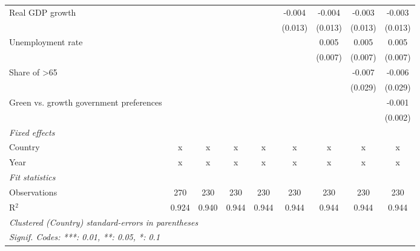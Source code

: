 \begin{table}[htbp]
\begin{tabular}{lcccccccc}
      Real GDP growth                                                 &         &         &                &                & -0.004         & -0.004         & -0.003         & -0.003\\   
                                                                      &         &         &                &                & (0.013)        & (0.013)        & (0.013)        & (0.013)\\   
      Unemployment rate                                               &         &         &                &                &                & 0.005          & 0.005          & 0.005\\   
                                                                      &         &         &                &                &                & (0.007)        & (0.007)        & (0.007)\\   
      Share of >65                                                    &         &         &                &                &                &                & -0.007         & -0.006\\   
                                                                      &         &         &                &                &                &                & (0.029)        & (0.029)\\   
      Green vs. growth government preferences                         &         &         &                &                &                &                &                & -0.001\\   
                                                                      &         &         &                &                &                &                &                & (0.002)\\   
      \emph{Fixed effects}\\
      Country                                                         & x       & x       & x              & x              & x              & x              & x              & x\\  
      Year                                                            & x       & x       & x              & x              & x              & x              & x              & x\\  
      \midrule \emph{Fit statistics}\\
      Observations                                                    & 270     & 230     & 230            & 230            & 230            & 230            & 230            & 230\\  
      R$^2$                                                           & 0.924   & 0.940   & 0.944          & 0.944          & 0.944          & 0.944          & 0.944          & 0.944\\  
      \midrule
      \multicolumn{9}{l}{\emph{Clustered (Country) standard-errors in parentheses}}\\
      \multicolumn{9}{l}{\emph{Signif. Codes: ***: 0.01, **: 0.05, *: 0.1}}\\
   \end{tabular}
\end{table}


